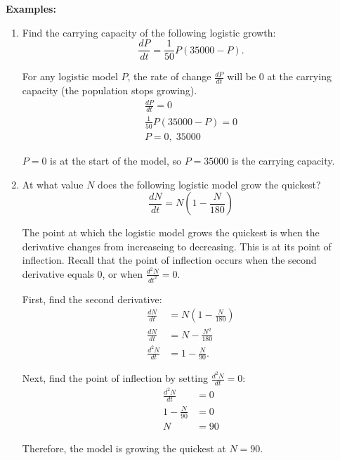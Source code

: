 \documentclass[12pt]{article}
\begin{document}
\noindent \textbf{Examples:}
\begin{enumerate}
	\item Find the carrying capacity of the following logistic growth:
	\[ \frac{dP}{dt} = \frac{1}{50} P (35000 - P). \]

	For any logistic model $P$, the rate of change $\frac{dP}{dt}$ will be $0$ at the carrying capacity (the population stops growing).
	\begin{gather*}
		\frac{dP}{dt} = 0 \\[5pt]
		\frac{1}{50} P (35000 - P) = 0 \\[5pt]
		P = 0, \; 35000
	\end{gather*}

	$P = 0$ is at the start of the model, so $P = 35000$ is the carrying capacity.

	\item At what value $N$ does the following logistic model grow the quickest?
	\[ \frac{dN}{dt} = N \left( 1 - \frac{N}{180} \right) \]

	The point at which the logistic model grows the quickest is when the derivative changes from increaseing to decreasing. This is at its point of inflection. Recall that the point of inflection occurs when the second derivative equals $0$, or when $\frac{d^2 N}{dt^2} = 0$.

	First, find the second derivative:
	\begin{align*}
		\frac{dN}{dt} &= N \left( 1 - \frac{N}{180} \right) \\[5pt]
		\frac{dN}{dt} &= N - \frac{N^2}{180} \\[5pt]
		\frac{d^2 N}{dt} &= 1 - \frac{N}{90}.
	\end{align*}

	Next, find the point of inflection by setting $\frac{d^2 N}{dt} = 0$:
	\begin{align*}
		\frac{d^2 N}{dt} &= 0 \\[5pt]
		1 - \frac{N}{90} &= 0 \\[5pt]
		N &= 90
	\end{align*}

	Therefore, the model is growing the quickest at $N = 90$.
\end{enumerate}
\end{document}
